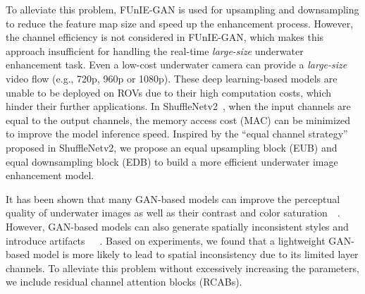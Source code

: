 \documentclass[utf8]{FrontiersinHarvard} %
\begin{document}
To alleviate this problem, FUnIE-GAN is used for upsampling and downsampling to reduce the feature map size and speed up the enhancement process. However, the channel efficiency is not considered in FUnIE-GAN, which makes this approach insufficient for handling the real-time \textit{large-size} underwater enhancement task. Even a low-cost underwater camera can provide a \textit{large-size} video flow (e.g., 720p, 960p or 1080p). These deep learning-based models are unable to be deployed on ROVs due to their high computation costs, which hinder their further applications. In ShuffleNetv2~\citep{2018ShuffleNet}, when the input channels are equal to the output channels, the memory access cost (MAC) can be minimized to improve the model inference speed. Inspired by the ``equal channel strategy'' proposed in ShuffleNetv2, we propose an equal upsampling block (EUB) and equal downsampling block (EDB) to build a more efficient underwater image enhancement model.

It has been shown that many GAN-based models can improve the perceptual quality of underwater images as well as their contrast and color saturation~\citep{2020Underwater}~\citep{9001231}. However, GAN-based models can also generate spatially inconsistent styles and introduce artifacts~\citep{2021LAFFNet}~\citep{wang2021uiec}~\citep{8917818}. Based on experiments, we found that a lightweight GAN-based model is more likely to lead to spatial inconsistency due to its limited layer channels. To alleviate this problem without excessively increasing the parameters, we include residual channel attention blocks (RCABs). 
\end{document}
